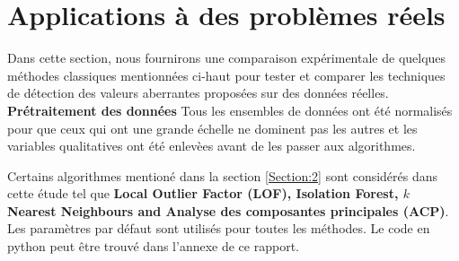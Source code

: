 
\section{Applications à des problèmes réels}\label{Section:6}

Dans cette section, nous fournirons une comparaison expérimentale de quelques méthodes classiques  mentionnées ci-haut  pour tester et comparer les techniques de détection des valeurs aberrantes proposées sur des données réelles.
\noindent\textbf{Prétraitement des données} Tous les ensembles de données ont été normalisés pour que ceux qui ont une grande échelle ne dominent pas les autres et les variables qualitatives ont été enlevèes avant de les passer aux algorithmes.

\noindent Certains algorithmes mentioné dans la section \ref{Section:2} sont considérés dans cette étude tel que \textbf{Local Outlier Factor (LOF), Isolation Forest, $k$ Nearest Neighbours and Analyse des composantes principales (ACP)}. Les paramètres par défaut sont utilisés pour toutes les méthodes. Le code en python peut être trouvé dans l'annexe de ce rapport. \newl



